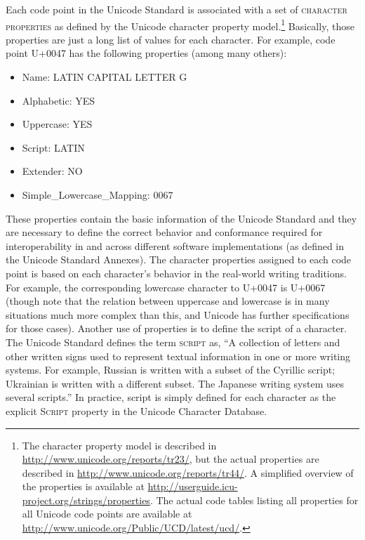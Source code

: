 Each code point in the Unicode Standard is associated with a set of \textsc{character properties} as defined by the Unicode character property model.\footnote{The character property model is described in \url{http://www.unicode.org/reports/tr23/}, but the actual properties are described in \url{http://www.unicode.org/reports/tr44/}. A simplified overview of the properties is available at \url{http://userguide.icu-project.org/strings/properties}. The actual code tables listing all properties for all Unicode code points are available at \url{http://www.unicode.org/Public/UCD/latest/ucd/}.} Basically, those properties are just a long list of values for each character. For example, code point U+0047 has the following properties (among many others):
\begin{itemize}
	\item Name: LATIN CAPITAL LETTER G 
	\item Alphabetic: YES 
	\item Uppercase: YES 
	\item Script: LATIN 
	\item Extender: NO 
	\item Simple\_Lowercase\_Mapping: 0067 
\end{itemize}

These properties contain the basic information of the Unicode Standard and they are necessary to define the correct behavior and conformance required for interoperability in and across different software implementations (as defined in the Unicode Standard Annexes). The character properties assigned to each code point is based on each character's behavior in the real-world writing traditions. For example, the corresponding lowercase character to U+0047 is U+0067 (though note that the relation between uppercase and lowercase is in many situations much more complex than this, and Unicode has further specifications for those cases). Another use of properties is to define the script of a character. The Unicode Standard defines the term \textsc{script} as, ``A collection of letters and other written signs used to represent textual information in one or more writing systems. For example, Russian is written with a subset of the Cyrillic script; Ukrainian is written with a different subset. The Japanese writing system uses several scripts.'' In practice, script is simply defined for each character as the explicit \textsc{Script} property in the Unicode Character Database.

